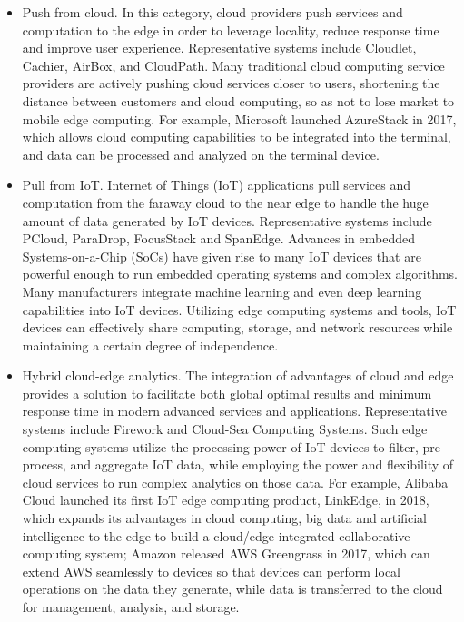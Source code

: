 \begin{itemize}
\item Push from cloud. In this category, cloud providers push services and computation to the edge in order to leverage locality, reduce response time and improve user experience. Representative systems include Cloudlet, Cachier, AirBox, and CloudPath. Many traditional cloud computing service providers are actively pushing cloud services closer to users, shortening the distance between customers and cloud computing, so as not to lose market to mobile edge computing. For example, Microsoft launched AzureStack in 2017, which allows cloud computing capabilities to be integrated into the terminal, and data can be processed and analyzed on the terminal device.
\item Pull from IoT. Internet of Things (IoT) applications pull services and computation from the faraway cloud to the near edge to handle the huge amount of data generated by IoT devices. Representative systems include PCloud, ParaDrop, FocusStack and SpanEdge. Advances in embedded Systems-on-a-Chip (SoCs) have given rise to many IoT devices that are powerful enough to run embedded operating systems and complex algorithms. Many manufacturers integrate machine learning and even deep learning capabilities into IoT devices. Utilizing edge computing systems and tools, IoT devices can effectively share computing, storage, and network resources while maintaining a certain degree of independence.
\item Hybrid cloud-edge analytics. The integration of advantages of cloud and edge provides a solution to facilitate both global optimal results and minimum response time in modern advanced services and applications. Representative systems include Firework and Cloud-Sea Computing Systems. Such edge computing systems utilize the processing power of IoT devices to filter, pre-process, and aggregate IoT data, while employing the power and flexibility of cloud services to run complex analytics on those data. For example, Alibaba Cloud launched its first IoT edge computing product, LinkEdge, in 2018, which expands its advantages in cloud computing, big data and artificial intelligence to the edge to build a cloud/edge integrated collaborative computing system; Amazon released AWS Greengrass in 2017, which can extend AWS seamlessly to devices so that devices can perform local operations on the data they generate, while data is transferred to the cloud for management, analysis, and storage.
\end{itemize}
